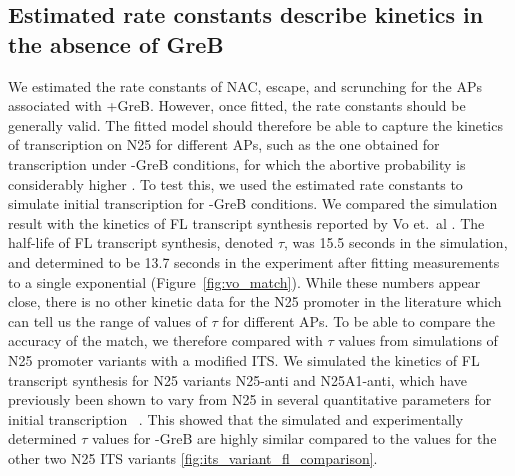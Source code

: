 \subsection{Estimated rate constants describe kinetics in the absence of GreB}
We estimated the rate constants of NAC, escape, and scrunching for the
APs associated with +GreB. However, once fitted, the rate constants should
be generally valid. The fitted model should therefore be able to capture the
kinetics of transcription on N25 for different APs, such as the
one obtained for transcription under -GreB conditions, for which the abortive
probability is considerably higher \cite{hsu_initial_2006}. To test this, we
used the estimated rate constants to simulate initial transcription for
-GreB conditions. We compared the simulation result with the kinetics
of FL transcript synthesis reported by Vo et.\ al \cite{vo_vitro_2003-1}.
The half-life of FL transcript synthesis, denoted $\tau$, was 15.5 seconds in
the simulation, and determined to be 13.7 seconds in the experiment after
fitting measurements to a single exponential (Figure~\ref{fig:vo_match}).
While these numbers appear close, there is no other kinetic data for the N25
promoter in the literature which can tell us the range of values of $\tau$ for
different APs. To be able to compare the accuracy of the match,
we therefore compared with $\tau$ values from simulations of N25 promoter
variants with a modified ITS. We simulated the kinetics of FL transcript
synthesis for N25 variants N25-anti and N25A1-anti, which have previously been
shown to vary from N25 in several quantitative parameters for initial
transcription~
\cite{hsu_initial_2006,chan_anti-initial_2001,kammerer_functional_1986}. This
showed that the simulated and experimentally determined $\tau$ values for
-GreB are highly similar compared to the values for the other two N25 ITS
variants \ref{fig:its_variant_fl_comparison}.

